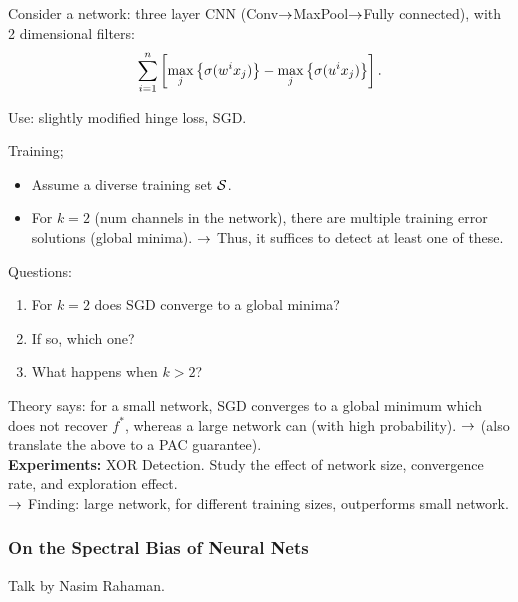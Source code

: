 Consider a network: three layer CNN (Conv$\rightarrow$MaxPool$\rightarrow$Fully connected), with 2 dimensional filters:
\[
\sum_{i = 1}^n \left[ \max_j \left\{\sigma(w^i x_j)\right\} - \max_j\left\{ \sigma(u^i x_j)\right\}\right].
\]

Use: slightly modified hinge loss, SGD. \\


Training;
\begin{itemize}
    \item Assume a diverse training set $\mathcal{S}$.
    \item For $k=2$ (num channels in the network), there are multiple training error solutions (global minima).
    $\rightarrow$ Thus, it suffices to detect at least one of these.
\end{itemize}

Questions:
\begin{enumerate}
    \item For $k=2$ does SGD converge to a global minima?
    
    \item If so, which one?
    
    \item What happens when $k > 2$?
\end{enumerate}

Theory says: for a small network, SGD converges to a global minimum which does not recover $f^*$, whereas a large network can (with high probability). $\rightarrow$ (also translate the above to a PAC guarantee). \\

{\bf Experiments:} XOR Detection. Study the effect of network size, convergence rate, and exploration effect. \\

$\rightarrow$ Finding: large network, for different training sizes, outperforms small network.

\spacerule

\subsubsection{On the Spectral Bias of Neural Nets~\cite{rahaman2018spectral}}

Talk by Nasim Rahaman. \\

